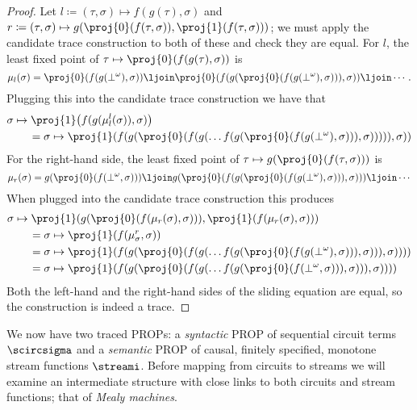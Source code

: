 \documentclass{lmcs}
\begin{document}
\begin{proof}
    Let \(l \coloneqq (\tau, \sigma) \mapsto f(g(\tau), \sigma)\) and
    \(r \coloneqq (\tau, \sigma)
    \mapsto
    g(\proj{0}\mleft(f(\tau, \sigma)\mright),
    \proj{1}\mleft(f(\tau, \sigma)\mright))\); we must apply the candidate
    trace construction to both of these and check they are equal.
    For \(l\), the least fixed point of \(
    \tau \mapsto \proj{0}\mleft(f(g(\tau), \sigma)\mright)
    \) is \[
        \mu_l(\sigma) =
        \proj{0}\mleft(f(g(\bot^\omega), \sigma)\mright) \ljoin
        \proj{0}\mleft(f(g(\proj{0}\mleft(f(g(\bot^\omega), \sigma))\mright), \sigma)\mright) \ljoin
        \cdots.\]
    Plugging this into the candidate trace construction we have that \begin{align*}
         &
        \sigma \mapsto \proj{1}\mleft(f(g(\mu_l^l(\sigma)), \sigma)\mright)
        \\
         & \qquad=
        \sigma \mapsto \proj{1}\mleft(f(g(\proj{0}\mleft(f(g(\dots f(g(\proj{0}\mleft(f(g(\bot^\omega), \sigma)\mright)), \sigma)))\mright)), \sigma)\mright)
    \end{align*}
    For the right-hand side, the least fixed point of \(
    \tau \mapsto g(\proj{0}\mleft(f(\tau, \sigma)\mright))
    \) is \[
        \mu_r(\sigma) =
        g(\proj{0}\mleft(f(\bot^\omega, \sigma)\mright)) \ljoin
        g(\proj{0}\mleft(f(g(\proj{0}\mleft(f(g(\bot^\omega), \sigma)\mright)), \sigma)\mright)) \ljoin
        \cdots
    \]
    When plugged into the candidate trace construction this produces \begin{align*}
         & \sigma \mapsto \proj{1}\mleft(g(\proj{0}(f(\mu_r(\sigma), \sigma))), \proj{1}(f(\mu_r(\sigma), \sigma))\mright)
        \\
         & \qquad =
        \sigma \mapsto \proj{1}(f(\mu_\sigma^r, \sigma))
        \\
         & \qquad=
        \sigma \mapsto \proj{1}(f(
        g(\proj{0}\mleft(f(g(\dots f(g(\proj{0}\mleft(f(g(\bot^\omega), \sigma)\mright)), \sigma)\mright)), \sigma))))
        \\
         & \qquad=
        \sigma \mapsto \proj{1}(f(
        g(\proj{0}\mleft(f(g(\dots f(g(\proj{0}\mleft(f(\bot^\omega, \sigma)\mright)), \sigma)\mright)), \sigma))))
    \end{align*}
    Both the left-hand and the right-hand sides of the sliding equation are
    equal, so the construction is indeed a trace.
\end{proof}

We now have two traced PROPs: a \emph{syntactic} PROP of sequential circuit
terms \(\scircsigma\) and a \emph{semantic} PROP of causal, finitely
specified, monotone stream functions \(\streami\).
Before mapping from circuits to streams we will examine an intermediate
structure with close links to both circuits and stream functions; that of
\emph{Mealy machines}.
\end{document}
